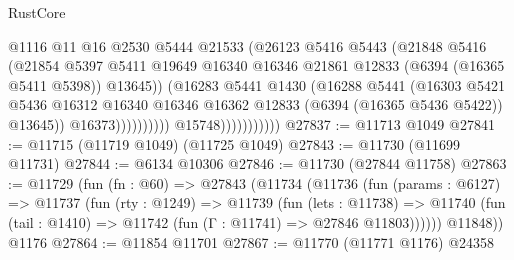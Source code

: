 \begin{lexlean}{RustCore}
\begin{coremodule}
                                          @1116
                                          @11
                                          @16
                                          @2530
                                          @5444
                                          @21533
                                          (@26123
                                            @5416
                                            @5443
                                            (@21848
                                              @5416
                                              (@21854
                                                @5397
                                                @5411
                                                @19649
                                                @16340
                                                @16346
                                                @21861
                                                @12833
                                                (@6394 (@16365 @5411 @5398))
                                                @13645))
                                            (@16283
                                              @5441
                                              @1430
                                              (@16288
                                                @5441
                                                (@16303
                                                  @5421
                                                  @5436
                                                  @16312
                                                  @16340
                                                  @16346
                                                  @16362
                                                  @12833
                                                  (@6394 (@16365 @5436 @5422))
                                                  @13645))
                                              @16373))))))))))
                          @15748)))))))))))
@27837 := @11713 @1049
@27841 := @11715 (@11719 @1049) (@11725 @1049)
@27843 := @11730 (@11699 @11731)
@27844 := @6134 @10306
@27846 := @11730 (@27844 @11758)
@27863 := @11729
    (fun (fn : @60) =>
    @27843
      (@11734
        (@11736
          (fun (params : @6127) =>
          @11737
            (fun (rty : @1249) =>
            @11739
              (fun (lets : @11738) =>
              @11740 (fun (tail : @1410) => @11742 (fun (Γ : @11741) => @27846 @11803))))))
        @11848))
    @1176
@27864 := @11854 @11701
@27867 := @11770 (@11771 @1176) @24358

\end{coremodule}
\end{lexlean}
